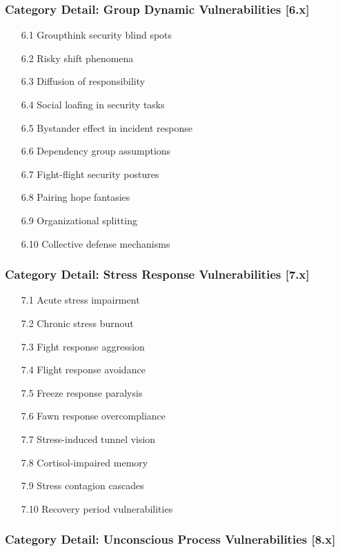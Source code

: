 \documentclass[11pt,a4paper]{article}
\begin{document}
\subsubsection{Category Detail: Group Dynamic Vulnerabilities [6.x]}

\begin{enumerate}
\item[6.1] Groupthink security blind spots
\item[6.2] Risky shift phenomena
\item[6.3] Diffusion of responsibility
\item[6.4] Social loafing in security tasks
\item[6.5] Bystander effect in incident response
\item[6.6] Dependency group assumptions
\item[6.7] Fight-flight security postures
\item[6.8] Pairing hope fantasies
\item[6.9] Organizational splitting
\item[6.10] Collective defense mechanisms
\end{enumerate}

\subsubsection{Category Detail: Stress Response Vulnerabilities [7.x]}

\begin{enumerate}
\item[7.1] Acute stress impairment
\item[7.2] Chronic stress burnout
\item[7.3] Fight response aggression
\item[7.4] Flight response avoidance
\item[7.5] Freeze response paralysis
\item[7.6] Fawn response overcompliance
\item[7.7] Stress-induced tunnel vision
\item[7.8] Cortisol-impaired memory
\item[7.9] Stress contagion cascades
\item[7.10] Recovery period vulnerabilities
\end{enumerate}

\subsubsection{Category Detail: Unconscious Process Vulnerabilities [8.x]}
\end{document}
